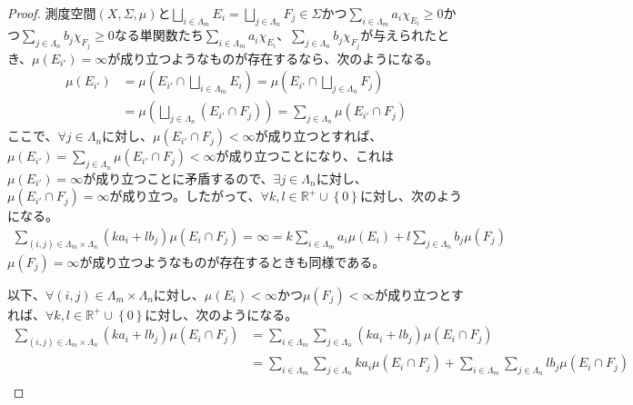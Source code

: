 \documentclass[dvipdfmx]{jsarticle}
\begin{document}
\begin{proof}
測度空間$(X,\varSigma,\mu)$と$\bigsqcup_{i \in \varLambda_{m}} E_{i} = \bigsqcup_{j \in \varLambda_{n}} F_{j} \in \varSigma$かつ$\sum_{i \in \varLambda_{m}} {a_{i}\chi_{E_{i}}} \geq 0$かつ$\sum_{j \in \varLambda_{n}} {b_{j}\chi_{F_{j}}} \geq 0$なる単関数たち$\sum_{i \in \varLambda_{m}} {a_{i}\chi_{E_{i}}}$、$\sum_{j \in \varLambda_{n}} {b_{j}\chi_{F_{j}}}$が与えられたとき、$\mu\left( E_{i'} \right) = \infty$が成り立つようなものが存在するなら、次のようになる。
\begin{align*}
\mu\left( E_{i'} \right) &= \mu\left( E_{i'} \cap \bigsqcup_{i \in \varLambda_{m}} E_{i} \right) = \mu\left( E_{i'} \cap \bigsqcup_{j \in \varLambda_{n}} F_{j} \right)\\
&= \mu\left( \bigsqcup_{j \in \varLambda_{n}} \left( E_{i'} \cap F_{j} \right) \right) = \sum_{j \in \varLambda_{n}} {\mu\left( E_{i'} \cap F_{j} \right)}
\end{align*}
ここで、$\forall j \in \varLambda_{n}$に対し、$\mu\left( E_{i'} \cap F_{j} \right) < \infty$が成り立つとすれば、$\mu\left( E_{i'} \right) = \sum_{j \in \varLambda_{n}} {\mu\left( E_{i'} \cap F_{j} \right)} < \infty$が成り立つことになり、これは$\mu\left( E_{i'} \right) = \infty$が成り立つことに矛盾するので、$\exists j \in \varLambda_{n}$に対し、$\mu\left( E_{i'} \cap F_{j} \right) = \infty$が成り立つ。したがって、$\forall k,l \in \mathbb{R}^{+} \cup \left\{ 0 \right\}$に対し、次のようになる。
\begin{align*}
\sum_{(i,j) \in \varLambda_{m} \times \varLambda_{n}} {\left( ka_{i} + lb_{j} \right)\mu\left( E_{i} \cap F_{j} \right)} = \infty = k\sum_{i \in \varLambda_{m}} {a_{i}\mu\left( E_{i} \right)} + l\sum_{j \in \varLambda_{n}} {b_{j}\mu\left( F_{j} \right)}
\end{align*}
$\mu\left( F_{j} \right) = \infty$が成り立つようなものが存在するときも同様である。\par
以下、$\forall(i,j) \in \varLambda_{m} \times \varLambda_{n}$に対し、$\mu\left( E_{i} \right) < \infty$かつ$\mu\left( F_{j} \right) < \infty$が成り立つとすれば、$\forall k,l \in \mathbb{R}^{+} \cup \left\{ 0 \right\}$に対し、次のようになる。
\begin{align*}
\sum_{(i,j) \in \varLambda_{m} \times \varLambda_{n}} {\left( ka_{i} + lb_{j} \right)\mu\left( E_{i} \cap F_{j} \right)} &= \sum_{i \in \varLambda_{m}} {\sum_{j \in \varLambda_{n}} {\left( ka_{i} + lb_{j} \right)\mu\left( E_{i} \cap F_{j} \right)}}\\
&= \sum_{i \in \varLambda_{m}} {\sum_{j \in \varLambda_{n}} {ka_{i}\mu\left( E_{i} \cap F_{j} \right)}} + \sum_{i \in \varLambda_{m}} {\sum_{j \in \varLambda_{n}} {lb_{j}\mu\left( E_{i} \cap F_{j} \right)}}\\

\end{align*}
\end{proof}
\end{document}
